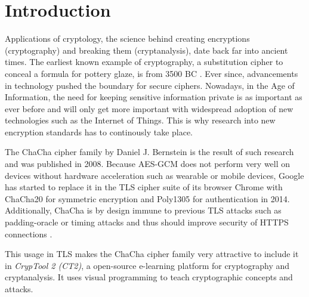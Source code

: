 \chapter{Introduction}

Applications of cryptology, the science behind creating encryptions (cryptography) and breaking them (cryptanalysis), date back far into ancient times. The earliest known example of  cryptography, a substitution cipher to conceal a formula for pottery glaze, is from 3500 BC \cite{history}. Ever since, advancements in technology pushed the boundary for secure ciphers. Nowadays, in the Age of Information, the need for keeping sensitive information private is as important as ever before and will only get more important with widespread adoption of new technologies such as the Internet of Things. This is why research into new encryption standards has to continously take place.

The ChaCha cipher family by Daniel J. Bernstein is the result of such research and was published in 2008. Because AES-GCM does not perform very well on devices without hardware acceleration such as wearable or mobile devices, Google has started to replace it in the TLS cipher suite of its browser Chrome with ChaCha20 for symmetric encryption and Poly1305 for authentication in 2014. Additionally, ChaCha is by design immune to previous TLS attacks such as padding-oracle or timing attacks and thus should improve security of HTTPS connections \cite{googlesecurityblog}.

This usage in TLS makes the ChaCha cipher family very attractive to include it in \textit{CrypTool 2 (CT2)}, a open-source e-learning platform for cryptography and cryptanalysis. It uses visual programming to teach cryptographic concepts and attacks.